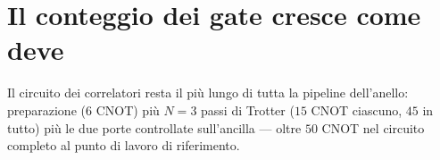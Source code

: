 \documentclass[11pt,a4paper]{article}
\begin{document}
\section{Il conteggio dei gate cresce come deve}

Il circuito dei correlatori resta il più lungo di tutta la pipeline
dell'anello: preparazione ($6$ CNOT) più $N=3$ passi di Trotter ($15$ CNOT
ciascuno, $45$ in tutto) più le due porte controllate sull'ancilla ---
oltre $50$ CNOT nel circuito completo al punto di lavoro di riferimento.
\end{document}
